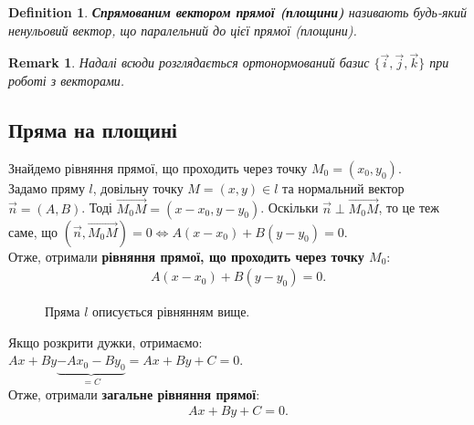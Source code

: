 \documentclass[a4paper, 10pt]{extarticle}
\theoremstyle{theoremdd}
\theoremstyle{theoremdd}
\newtheorem{definition}[theorem]{Definition}
\theoremstyle{theoremdd}
\theoremstyle{theoremdd}
\theoremstyle{theoremdd}
\theoremstyle{theoremdd}
\newtheorem{remark}[theorem]{Remark}
\theoremstyle{theoremdd}
\theoremstyle{theoremdd}
\begin{document}
\begin{definition}
\textbf{Спрямованим вектором прямої (площини)} називають будь-який ненульовий вектор, що паралельний до цієї прямої (площини).
\end{definition}

\begin{remark}
Надалі всюди розглядається ортонормований базис $\{\vec{i},\vec{j},\vec{k}\}$ при роботі з векторами.
\end{remark}

\subsection{Пряма на площині}
Знайдемо рівняння прямої, що проходить через точку $M_0 = (x_0,y_0)$.\\
Задамо пряму $l$, довільну точку $M = (x,y) \in l$ та нормальний вектор $\vec{n} = (A,B)$. Тоді $\overrightarrow{M_0M} = (x-x_0, y-y_0)$. Оскільки $\vec{n} \perp \overrightarrow{M_0 M}$, то це теж саме, що $(\vec{n}, \overrightarrow{M_0 M}) = 0 \iff A(x-x_0)+B(y-y_0)=0$.\\
Отже, отримали \textbf{рівняння прямої, що проходить через точку $M_0$}:
\begin{align*}
A(x-x_0) + B(y-y_0) = 0.
\end{align*}

\begin{figure}[H]
\centering
{}
\caption*{Пряма $l$ описується рівнянням вище.}
\end{figure}

Якщо розкрити дужки, отримаємо:\\
$Ax + By \underbrace{-Ax_0 - By_0}_{= C} = Ax+By+C = 0$.\\
Отже, отримали \textbf{загальне рівняння прямої}:
\begin{align*}
Ax + By + C = 0.
\end{align*}
\end{document}
